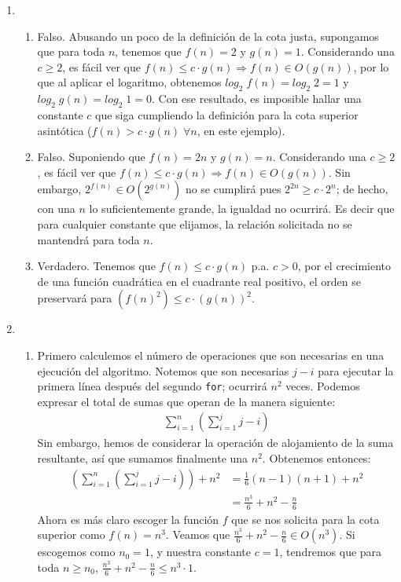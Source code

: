 \documentclass[12pt]{article}
\newenvironment{boenumerate}
               {\begin{enumerate}\renewcommand\labelenumi{\textbf{\theenumi.}}}
               {\end{enumerate}}
\begin{document}
\begin{boenumerate}
\begin{itemize}
  \end{itemize}  
\item
  \begin{enumerate}
  \item Falso. Abusando un poco de la definición de la cota justa, supongamos que para toda $n$, tenemos que $f(n) = 2$ y 
    $g(n) = 1$. Considerando una $c \geq 2$, es fácil ver que $f(n) \leq c \cdot g(n) \Rightarrow f(n) \in O(g(n))$, por lo que al aplicar el logaritmo, obtenemos $log_2\;f(n) = log_2\; 2 = 1$ y $log_2\;g(n) = log_2\; 1 = 0$. Con ese resultado, es imposible hallar una constante $c$ que siga cumpliendo la definición para la cota superior asintótica ($f(n) > c\cdot g(n) \;\forall n$, en este ejemplo).
  \item Falso. Suponiendo que $f(n) = 2n$ y $g(n) = n$. Considerando una $c \geq 2$, es fácil ver que $f(n) \leq c \cdot g(n) \Rightarrow f(n) \in O(g(n))$. Sin embargo, $2^{f(n)} \in O(2^{g(n)})$ no se cumplirá
    pues $2^{2n} \geq c \cdot 2^n$; de hecho, con una $n$ lo suficientemente grande, la igualdad no ocurrirá. Es decir que para cualquier constante que elijamos, la relación solicitada no se mantendrá para toda $n$.
  \item Verdadero. Tenemos que $f(n) \leq c \cdot g(n)$ p.a. $c > 0$, por el crecimiento
    de una función cuadrática en el cuadrante real positivo, el orden se preservará para
    $(f(n)^2) \leq c \cdot (g(n))^2$.
  \end{enumerate}
\item
  \begin{enumerate}
  \item Primero calculemos el número de operaciones que son necesarias en una ejecución del algoritmo. Notemos que son necesarias $j-i$ para ejecutar la primera línea después del segundo \texttt{for};
    ocurrirá $n^2$ veces. Podemos expresar el total de sumas que operan de la manera siguiente:
    \begin{align}
      \sum_{i=1}^{n}(\sum_{i=1}^{j} j-i)
    \end{align}
    Sin embargo, hemos de considerar la operación de alojamiento de la suma resultante, así que sumamos finalmente una $n^2$. Obtenemos entonces:
    \begin{align}
      (\sum_{i=1}^{n}(\sum_{i=1}^{j} j-i)) + n^2 &= \frac{1}{6}(n-1)(n+1) + n^2\\
      &= \frac{n^3}{6} + n^2 - \frac{n}{6}
    \end{align}
    Ahora es más claro escoger la función $f$ que se nos solicita para la cota superior como $f(n) = n^3$. Veamos que  $\frac{n^3}{6} + n^2 - \frac{n}{6} \in O(n^3)$. Si escogemos como $n_0 = 1$, y nuestra constante $c = 1$, tendremos que para toda $n \geq n_0$, $\frac{n^3}{6} + n^2 - \frac{n}{6} \leq n^3\cdot 1$. \\
    

\end{enumerate}
\end{boenumerate}
\end{document}
